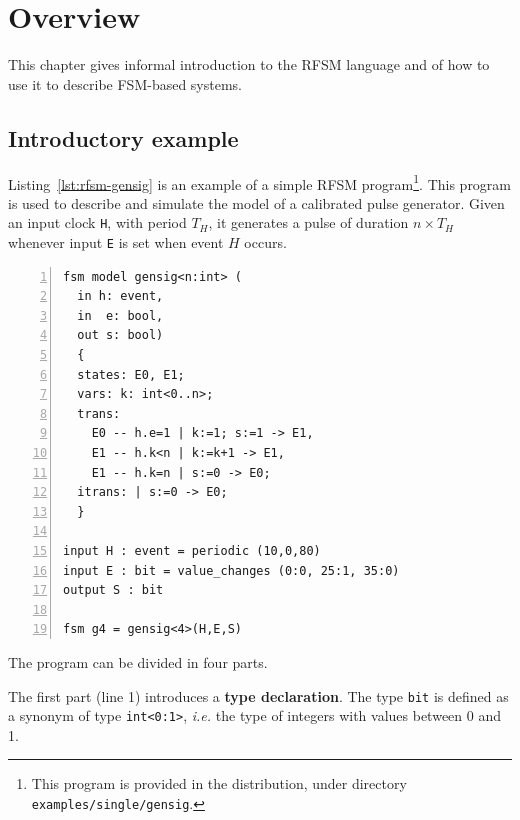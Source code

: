 \chapter{Overview}
\label{cha:overview}

This chapter gives informal introduction to the RFSM language and of how to use it to describe 
FSM-based systems.

\section{Introductory example}
\label{sec:first-example}

Listing~\ref{lst:rfsm-gensig} is an example of a simple RFSM program\footnote{This program is
  provided in the distribution, under directory \texttt{examples/single/gensig}.}. This program is
used to describe and simulate the model of a calibrated pulse generator. Given an input clock
\verb|H|, with period $T_H$, it generates a pulse of duration $n \times T_H$ whenever input
\texttt{E} is set when event $H$ occurs.

\begin{lstlisting}[language=Rfsm,frame=single,numbers=left,caption=A simple RFSM
  program,label={lst:rfsm-gensig},float]
fsm model gensig<n:int> (
  in h: event,
  in  e: bool,
  out s: bool)
  {
  states: E0, E1;
  vars: k: int<0..n>;
  trans: 
    E0 -- h.e=1 | k:=1; s:=1 -> E1,
    E1 -- h.k<n | k:=k+1 -> E1,
    E1 -- h.k=n | s:=0 -> E0;
  itrans: | s:=0 -> E0;
  }

input H : event = periodic (10,0,80)
input E : bit = value_changes (0:0, 25:1, 35:0)
output S : bit 

fsm g4 = gensig<4>(H,E,S)
\end{lstlisting}

The program can be divided in four parts.

\medskip
The first part (line 1) introduces a \textbf{type declaration}. The type \verb|bit| is defined as
a synonym of type \verb|int<0:1>|, \emph{i.e.} the type of integers with values between 0 and 1.

